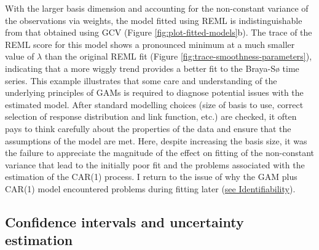 \documentclass[12pt,]{article}
\begin{document}
With the larger basis dimension and accounting for the non-constant
variance of the observations via weights, the model fitted using REML is
indistinguishable from that obtained using GCV (Figure
\ref{fig:plot-fitted-models}b). The trace of the REML score for this
model shows a pronounced minimum at a much smaller value of \(\lambda\)
than the original REML fit (Figure
\ref{fig:trace-smoothness-parameters}), indicating that a more wiggly
trend provides a better fit to the Braya-Sø time series. This example
illustrates that some care and understanding of the underlying
principles of GAMs is required to diagnose potential issues with the
estimated model. After standard modelling choices (size of basis to use,
correct selection of response distribution and link function, etc.) are
checked, it often pays to think carefully about the properties of the
data and ensure that the assumptions of the model are met. Here, despite
increasing the basis size, it was the failure to appreciate the
magnitude of the effect on fitting of the non-constant variance that
lead to the initially poor fit and the problems associated with the
estimation of the CAR(1) process. I return to the issue of why the GAM
plus CAR(1) model encountered problems during fitting later
(\protect\hyperlink{identifiability}{see Identifiability}).

\hypertarget{confints}{\subsection{Confidence intervals and uncertainty
estimation}\label{confints}}
\end{document}
